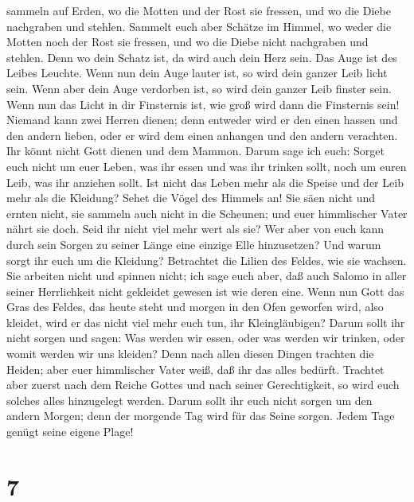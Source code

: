 sammeln auf Erden, wo die Motten und der Rost sie fressen, und wo die
Diebe nachgraben und stehlen.  Sammelt euch aber Schätze
im Himmel, wo weder die Motten noch der Rost sie fressen, und wo die
Diebe nicht nachgraben und stehlen.  Denn wo dein Schatz
ist, da wird auch dein Herz sein.  Das Auge ist des
Leibes Leuchte. Wenn nun dein Auge lauter ist, so wird dein ganzer Leib
licht sein.  Wenn aber dein Auge verdorben ist, so wird
dein ganzer Leib finster sein. Wenn nun das Licht in dir Finsternis ist,
wie groß wird dann die Finsternis sein!  Niemand kann
zwei Herren dienen; denn entweder wird er den einen hassen und den
andern lieben, oder er wird dem einen anhangen und den andern verachten.
Ihr könnt nicht Gott dienen und dem Mammon.  Darum sage
ich euch: Sorget euch nicht um euer Leben, was ihr essen und was ihr
trinken sollt, noch um euren Leib, was ihr anziehen sollt. Ist nicht das
Leben mehr als die Speise und der Leib mehr als die Kleidung?
 Sehet die Vögel des Himmels an! Sie säen nicht und
ernten nicht, sie sammeln auch nicht in die Scheunen; und euer
himmlischer Vater nährt sie doch. Seid ihr nicht viel mehr wert als sie?
 Wer aber von euch kann durch sein Sorgen zu seiner Länge
eine einzige Elle hinzusetzen?  Und warum sorgt ihr euch
um die Kleidung? Betrachtet die Lilien des Feldes, wie sie wachsen. Sie
arbeiten nicht und spinnen nicht;  ich sage euch aber,
daß auch Salomo in aller seiner Herrlichkeit nicht gekleidet gewesen ist
wie deren eine.  Wenn nun Gott das Gras des Feldes, das
heute steht und morgen in den Ofen geworfen wird, also kleidet, wird er
das nicht viel mehr euch tun, ihr Kleingläubigen?  Darum
sollt ihr nicht sorgen und sagen: Was werden wir essen, oder was werden
wir trinken, oder womit werden wir uns kleiden?  Denn
nach allen diesen Dingen trachten die Heiden; aber euer himmlischer
Vater weiß, daß ihr das alles bedürft.  Trachtet aber
zuerst nach dem Reiche Gottes und nach seiner Gerechtigkeit, so wird
euch solches alles hinzugelegt werden.  Darum sollt ihr
euch nicht sorgen um den andern Morgen; denn der morgende Tag wird für
das Seine sorgen. Jedem Tage genügt seine eigene Plage!

\hypertarget{section-6}{%
\section{7}\label{section-6}}

